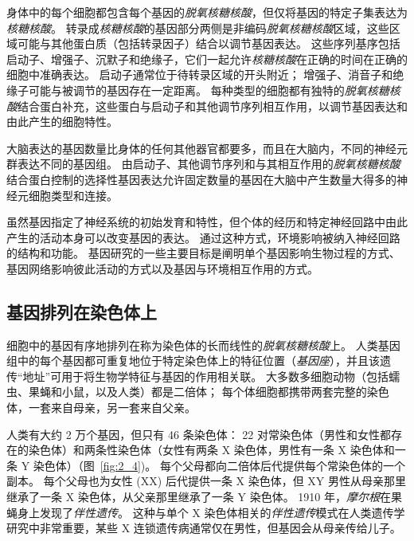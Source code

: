 身体中的每个细胞都包含每个基因的\textit{脱氧核糖核酸}，但仅将基因的特定子集表达为\textit{核糖核酸}。
转录成\textit{核糖核酸}的基因部分两侧是非编码\textit{脱氧核糖核酸}区域，这些区域可能与其他蛋白质（包括转录因子）结合以调节基因表达。
这些序列基序包括启动子、增强子、沉默子和绝缘子，它们一起允许\textit{核糖核酸}在正确的时间在正确的细胞中准确表达。
启动子通常位于待转录区域的开头附近；
增强子、消音子和绝缘子可能与被调节的基因存在一定距离。
每种类型的细胞都有独特的\textit{脱氧核糖核酸}结合蛋白补充，这些蛋白与启动子和其他调节序列相互作用，以调节基因表达和由此产生的细胞特性。


大脑表达的基因数量比身体的任何其他器官都要多，而且在大脑内，不同的神经元群表达不同的基因组。
由启动子、其他调节序列和与其相互作用的\textit{脱氧核糖核酸}结合蛋白控制的选择性基因表达允许固定数量的基因在大脑中产生数量大得多的神经元细胞类型和连接。


虽然基因指定了神经系统的初始发育和特性，但个体的经历和特定神经回路中由此产生的活动本身可以改变基因的表达。
通过这种方式，环境影响被纳入神经回路的结构和功能。
基因研究的一些主要目标是阐明单个基因影响生物过程的方式、基因网络影响彼此活动的方式以及基因与环境相互作用的方式。



\subsection{基因排列在染色体上}

细胞中的基因有序地排列在称为染色体的长而线性的\textit{脱氧核糖核酸}上。
人类基因组中的每个基因都可重复地位于特定染色体上的特征位置（\textit{基因座}），并且该遗传“地址”可用于将生物学特征与基因的作用相关联。
大多数多细胞动物（包括蠕虫、果蝇和小鼠，以及人类）都是二倍体；
每个体细胞都携带两套完整的染色体，一套来自母亲，另一套来自父亲。


人类有大约 2 万个基因，但只有 46 条染色体：
22 对常染色体（男性和女性都存在的染色体）和两条性染色体（女性有两条 X 染色体，男性有一条 X 染色体和一条 Y 染色体）（图~\ref{fig:2_4})。
每个父母都向二倍体后代提供每个常染色体的一个副本。
每个父母也为女性 (XX) 后代提供一条 X 染色体，但 XY 男性从母亲那里继承了一条 X 染色体，从父亲那里继承了一条 Y 染色体。
1910 年，\textit{摩尔根}在果蝇身上发现了\textit{伴性遗传}。
这种与单个 X 染色体相关的\textit{伴性遗传}模式在人类遗传学研究中非常重要，某些 X 连锁遗传病通常仅在男性，但基因会从母亲传给儿子。



